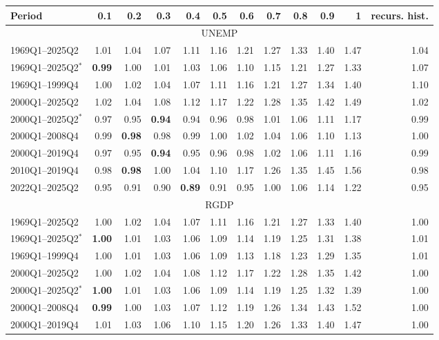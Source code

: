 \begin{tabular}{lrrrrrrrrrrr}
\hline
Period & 0.1 & 0.2 & 0.3 & 0.4 & 0.5 & 0.6 & 0.7 & 0.8 & 0.9 & 1 & recurs. hist. \\
\hline
\multicolumn{12}{c}{UNEMP} \\
1969Q1--2025Q2 & 1.01 & 1.04 & 1.07 & 1.11 & 1.16 & 1.21 & 1.27 & 1.33 & 1.40 & 1.47 & 1.04 \\
1969Q1--2025Q2$^*$ & \textbf{0.99} & 1.00 & 1.01 & 1.03 & 1.06 & 1.10 & 1.15 & 1.21 & 1.27 & 1.33 & 1.07 \\
1969Q1--1999Q4 & 1.00 & 1.02 & 1.04 & 1.07 & 1.11 & 1.16 & 1.21 & 1.27 & 1.34 & 1.40 & 1.10 \\
2000Q1--2025Q2 & 1.02 & 1.04 & 1.08 & 1.12 & 1.17 & 1.22 & 1.28 & 1.35 & 1.42 & 1.49 & 1.02 \\
2000Q1--2025Q2$^*$ & 0.97 & 0.95 & \textbf{0.94} & 0.94 & 0.96 & 0.98 & 1.01 & 1.06 & 1.11 & 1.17 & 0.99 \\
2000Q1--2008Q4 & 0.99 & \textbf{0.98} & 0.98 & 0.99 & 1.00 & 1.02 & 1.04 & 1.06 & 1.10 & 1.13 & 1.00 \\
2000Q1--2019Q4 & 0.97 & 0.95 & \textbf{0.94} & 0.95 & 0.96 & 0.98 & 1.02 & 1.06 & 1.11 & 1.16 & 0.99 \\
2010Q1--2019Q4 & 0.98 & \textbf{0.98} & 1.00 & 1.04 & 1.10 & 1.17 & 1.26 & 1.35 & 1.45 & 1.56 & 0.98 \\
2022Q1--2025Q2 & 0.95 & 0.91 & 0.90 & \textbf{0.89} & 0.91 & 0.95 & 1.00 & 1.06 & 1.14 & 1.22 & 0.95 \\
\hline
\multicolumn{12}{c}{RGDP} \\
1969Q1--2025Q2 & 1.00 & 1.02 & 1.04 & 1.07 & 1.11 & 1.16 & 1.21 & 1.27 & 1.33 & 1.40 & 1.00 \\
1969Q1--2025Q2$^*$ & \textbf{1.00} & 1.01 & 1.03 & 1.06 & 1.09 & 1.14 & 1.19 & 1.25 & 1.31 & 1.38 & 1.01 \\
1969Q1--1999Q4 & 1.00 & 1.01 & 1.03 & 1.06 & 1.09 & 1.13 & 1.18 & 1.23 & 1.29 & 1.35 & 1.01 \\
2000Q1--2025Q2 & 1.00 & 1.02 & 1.04 & 1.08 & 1.12 & 1.17 & 1.22 & 1.28 & 1.35 & 1.42 & 1.00 \\
2000Q1--2025Q2$^*$ & \textbf{1.00} & 1.01 & 1.03 & 1.06 & 1.09 & 1.14 & 1.19 & 1.25 & 1.32 & 1.39 & 1.00 \\
2000Q1--2008Q4 & \textbf{0.99} & 1.00 & 1.03 & 1.07 & 1.12 & 1.19 & 1.26 & 1.34 & 1.43 & 1.52 & 1.00 \\
2000Q1--2019Q4 & 1.01 & 1.03 & 1.06 & 1.10 & 1.15 & 1.20 & 1.26 & 1.33 & 1.40 & 1.47 & 1.00 \\

\end{tabular}
